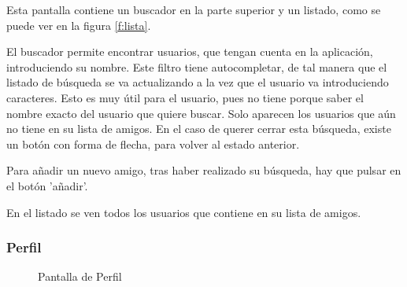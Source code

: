 \documentclass[a4paper, 12pt]{book}
\begin{document}
Esta pantalla contiene un buscador en la parte superior y un listado, como se puede ver en
la figura \ref{f:lista}.

El buscador permite encontrar usuarios, que tengan cuenta en la aplicaci\'on, introduciendo
su nombre. Este filtro tiene autocompletar, de tal manera que el listado de b\'usqueda se va actualizando
a la vez que el usuario va introduciendo caracteres. Esto es muy \'util para el usuario,
pues no tiene porque saber el nombre exacto del usuario que quiere buscar. Solo aparecen los
usuarios que a\'un no tiene en su lista de amigos. En el caso de querer cerrar esta b\'usqueda,
existe un bot\'on con forma de flecha, para volver al estado anterior.

Para a\~nadir un nuevo amigo, tras haber realizado su b\'usqueda, hay que pulsar en el bot\'on
'a\~nadir'.

En el listado se ven todos los usuarios que contiene en su lista de amigos.


\subsubsection{Perfil}
\label{sec:perfil}

\begin{figure}[H]
 \centering
 \caption{Pantalla de Perfil}
 \label{f:perfil}
\end{figure}
\end{document}

